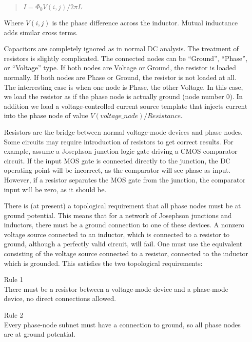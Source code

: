 \begin{quote}
$I = \Phi_0 V(i,j)/2{\pi}L$
\end{quote}

Where $V(i,j)$ is the phase difference across the inductor.  Mutual
inductance adds similar cross terms.

Capacitors are completely ignored as in normal DC analysis.  The
treatment of resistors is slightly complicated.  The connected nodes
can be ``Ground'', ``Phase'', or ``Voltage'' type.  If both nodes are
Voltage or Ground, the resistor is loaded normally.  If both nodes are
Phase or Ground, the resistor is not loaded at all.  The interresting
case is when one node is Phase, the other Voltage.  In this case, we
load the resistor as if the phase node is actually ground (node number
0).  In addition we load a voltage-controlled current source template
that injects current into the phase node of value
$V(voltage\_node)/Resistance$.

Resistors are the bridge between normal voltage-mode devices and phase
nodes.  Some circuits may require introduction of resistors to get
correct results.  For example, assume a Josephson junction logic gate
driving a CMOS comparator circuit.  If the input MOS gate is connected
directly to the junction, the DC operating point will be incorrect, as
the comparator will see phase as input.  However, if a resistor
separates the MOS gate from the junction, the comparator input will be
zero, as it should be.

There is (at present) a topological requirement that all phase nodes
must be at ground potential.  This means that for a network of
Josephson junctions and inductors, there must be a ground connection
to one of these devices.  A nonzero voltage source connected to an
inductor, which is connected to a resistor to ground, although a
perfectly valid circuit, will fail.  One must use the equivalent
consisting of the voltage source connected to a resistor, connected to
the inductor which is grounded.  This satisfies the two topological
requirements:

\begin{description}
\item{Rule 1}\\
There must be a resistor between a voltage-mode device and a
phase-mode device, no direct connections allowed.

\item{Rule 2}\\
Every phase-node subnet must have a connection to ground, so all phase
nodes are at ground potential.
\end{description}

